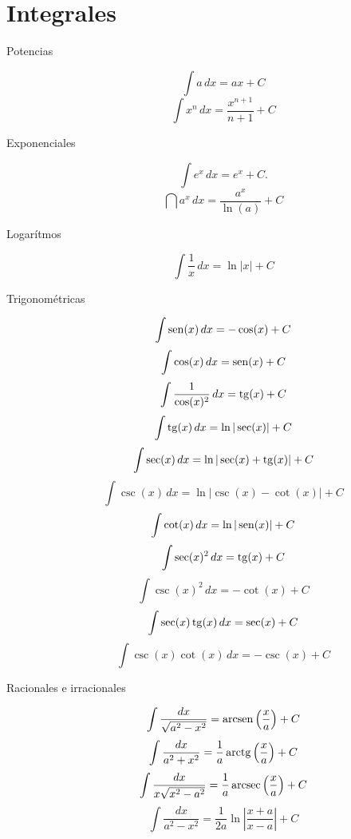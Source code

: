 \section*{Integrales}
\small
{}

\begin{multicols}{2}
\begin{tcolorbox}[hbox, title=Primitivas básicas]
\begin{minipage}{0.4\textwidth}
\begin{description}
  \item[Potencias]
  \[
    \int a\,dx=ax+C
  \]
  \[
    \int x^n\,dx=\dfrac{x^{n+1}}{n+1}+C
  \]
  \item[Exponenciales]
  \[
    \int e^x\,dx=e^x+C.
  \]
  \[
    \dint a^x\,dx=\dfrac{a^x}{\ln(a)}+C
  \]
  \item[Logarítmos]
  \[
    \int \dfrac{1}{x}\, dx=\ln|x|+C
  \]
  \item[Trigonométricas]
  \[
    \int \operatorname{sen}(x)\, dx=-\cos(x)+C
  \]
  \[
    \int \cos(x)\, dx=\operatorname{sen}(x)+C
  \]
  \[
    \int \frac{1}{\cos(x)^2}\, dx = \operatorname{tg}(x)+C
  \]
  \[
    \int \operatorname{tg}(x)\, dx=\ln|\sec(x)|+C
  \]
  \[
    \int \sec(x)\, dx = \ln|\sec(x) + \operatorname{tg}(x)|+C
  \]
  \[
    \int \csc(x)\, dx= \ln|\csc(x)-\cot(x)|+C
  \] 
  \[
    \int \cot(x) \, dx= \ln|\operatorname{sen}(x)|+C
  \] 
  \[
    \int \sec(x)^2\, dx= \operatorname{tg}(x)+ C
  \] 
  \[
    \int \csc(x)^2\, dx= -\cot(x)+ C
  \] 
  \[
    \int \sec(x)\operatorname{tg}(x)\, dx= \sec(x)+ C
  \] 
  \[
    \int \csc(x)\cot(x)\, dx = -\csc(x) +C
  \]
  \item[Racionales e irracionales]
  \[
    \int\frac{dx}{\sqrt{a^2-x^2}}=\operatorname{arcsen}\left(\frac{x}{a}\right)+C
  \] 
  \[
    \int\frac{dx}{a^2+x^2}=\frac{1}{a}\operatorname{arctg}\left(\dfrac{x}{a}\right)+C
  \] 
  \[
    \int\dfrac{dx}{x\sqrt{x^2-a^2}}=\frac{1}{a}\operatorname{arcsec}\left(\dfrac{x}{a}\right)+C
  \] 
  \[
    \int\frac{dx}{a^2-x^2}=\frac{1}{2a}\ln\left|\frac{x+a}{x-a}\right|+C
  \]
\end{description}
\end{minipage}
\end{tcolorbox}


\end{multicols}
